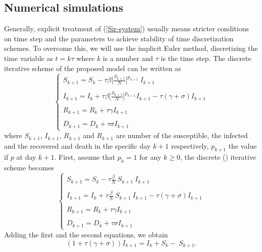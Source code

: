 \documentclass[final,a4paper,reqno]{elsarticle}
\numberwithin{equation}{section}
\begin{document}
\subsection{ Numerical simulations}
\noindent Generally, explicit treatment of  (\ref{Sir-system}) usually means stricter conditions on time step and the parameters  to
achieve stability of time discretization schemes. To overcome this, we will use   the implicit Euler method, discretizing the time variable as $t = k \tau$ where $k$ is a number and $\tau$ is the time step.
The discrete iterative scheme of the proposed model  can be written as
\begin{equation}\label{Sir-system_d}
\begin{cases}
\displaystyle S_{k+1} = S_{k} -\tau {\beta}  \Big[\frac{S_{k+1}}{N}\Big]^{p_{k+1}}\: I_{k+1}\\ \\
\displaystyle  I_{k+1} = I_{k} +\tau {\beta}  \Big[\frac{S_{k+1}}{N}\Big]^{p_{k+1}} I_{k+1} -\tau (\gamma+\sigma) I_{k+1}\\ \\
\displaystyle  R_{k+1} = R_{k} +\tau  \gamma I_{k+1}  \\ \\
\displaystyle  D_{k+1} = D_{k} +\tau  \sigma I_{k+1}
\end{cases}
\end{equation}
where $S_{k+1}$, $I_{k+1}$, $R_{k+1}$  and  $R_{k+1}$ are number of  the susceptible,  the infected and the recovered and death in the specific day $k+1$ respectively, $p_{k+1}$ the value if $p$ at day $k+1$. First, assume that  $p_{k}=1$ for any $k\geq 0$, the discrete (\label{Sir-system_d}) iterative scheme becomes
\begin{equation}\label{Sir-system-di2}
\begin{cases}
\displaystyle S_{k+1} = S_{k} -\tau \frac{\beta}{N} \: S_{k+1}\: I_{k+1}\\ \\
\displaystyle  I_{k+1} = I_{k} +\tau \frac{\beta}{N}  \: S_{k+1} \: I_{k+1} -\tau( \gamma+\sigma) I_{k+1}\\ \\
\displaystyle  R_{k+1} = R_{k} +\tau  \gamma I_{k+1}  \\ \\
\displaystyle  D_{k+1} = D_{k} +\tau  \sigma I_{k+1}
\end{cases}
\end{equation}
 Adding the first and the second equations, we obtain 
\begin{equation}\label{Eq1}
\displaystyle(1+\tau (\gamma+\sigma)) I_{k+1} =  I_{k}+S_{k} - \: S_{k+1}. 
\end{equation}
\end{document}
